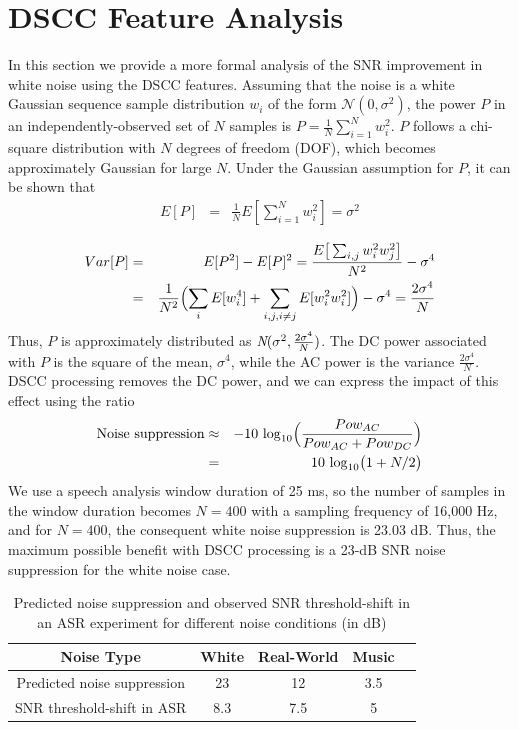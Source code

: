 \documentclass{article}
\begin{document}
\section{DSCC Feature Analysis}\label{sec:analysis}
In this section we provide a more formal analysis of the SNR improvement in white noise   using the DSCC features.    Assuming that the noise is a white   Gaussian   sequence sample distribution $w_i$ of the form
 $\mathcal{N}(0,\sigma^2)$, the power $P$ in an independently-observed set of $N$ samples is
 $P = \frac{1}{N}\sum_{i=1}^Nw_i^2$. $P$ follows a chi-square distribution with $N$ degrees of freedom (DOF), which becomes   approximately Gaussian for large $N$. Under the Gaussian   assumption
  for $P$, it can be shown that
\begin{eqnarray*}
E[P] &=& \frac{1}{N}E[\sum_{i=1}^Nw_i^2] = \sigma^2\\
\end{eqnarray*}
\begin{eqnarray*}
Var[P] &=& E[P^2] - E[P]^2 = \frac{E\big[\sum_{i,j}{w_i^2 w_j^2}\big]}{N^2} - \sigma^4\\
&=& \frac{1}{N^2}\Bigl(\sum_{i}E[{w_i^4}] + \displaystyle\sum_{i,j,i\neq j}E[w_i^2 w_i^2]\Bigr) - \sigma^4 = \frac{2\sigma^4}{N}
\end{eqnarray*}
Thus, $P$ is approximately distributed as $\emph{N}(\sigma^2,\frac{2\sigma^4}{N})$.  The    DC power associated with $P$ is  the square of the mean, $\sigma^4$, while the AC power is the variance $\frac{2\sigma^4}{N}$.    DSCC processing  removes the DC power, and we can express the impact of this effect using the ratio  \begin{eqnarray*}
\mbox{Noise suppression} &\approx& -10\,\log_{10}\Bigl(\frac{Pow_{AC}}{Pow_{AC}+Pow_{DC}}\Bigl)\\
                          & =&\;\;\;10\,\log_{10}\bigl(1+N/2\bigl)
\end{eqnarray*}
We use a speech analysis window duration of 25 ms, so the number of samples in the window duration becomes $N=400$
with a   sampling frequency of 16,000 Hz, and for $N=400$, the consequent  white noise suppression is 23.03 dB.
Thus, the maximum possible benefit with DSCC processing is a 23-dB SNR noise suppression for the white noise case.
\begin{table}[h]
\label{T:noise_suppress}
\centering
\begin{tabular}[h]{|c|c|c|c|c|}
\hline
Noise Type & White & Real-World  & Music\\
\hline
Predicted noise suppression & 23 &12 &3.5\\
\hline
SNR threshold-shift in ASR & 8.3 & 7.5 &5\\
\hline
\end{tabular}
\caption{Predicted noise suppression and observed SNR threshold-shift in an ASR experiment for different noise conditions (in dB)}
\end{table}
\end{document}

